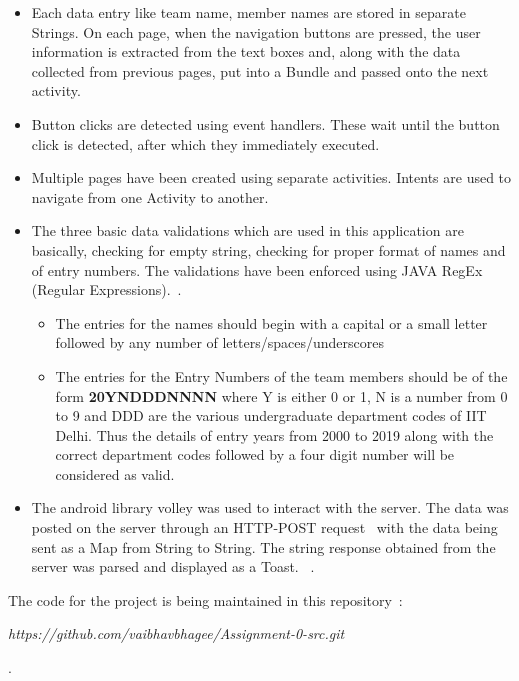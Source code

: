 \documentclass[12pt]{article}
\begin{document}
\begin{itemize}
\item Each data entry like team name, member names are stored in separate Strings. On each page, when the navigation buttons are pressed, the user information is extracted from the text boxes and, along with the data collected from previous pages, put into a Bundle and passed onto the next activity.
\item Button clicks are detected using event handlers. These wait until the button click is detected, after which they immediately executed.
\item Multiple pages have been created using separate activities. Intents are used to navigate from one Activity to another. 
\item The three basic data validations which are used in this application are basically, checking for empty string, checking for proper format of names and of entry numbers. The validations have been enforced using JAVA RegEx (Regular Expressions).~\cite{regex_test}.
	\begin{itemize}
		\item The entries for the names should begin with a capital or a small letter followed by any number of letters/spaces/underscores
		\item The entries for the Entry Numbers of the team members should be of the form \textbf{20YNDDDNNNN} where Y is either 0 or 1, N is a number from 0 to 9 and DDD are the various undergraduate department codes of IIT Delhi. Thus the details of entry years from 2000 to 2019 along with the correct department codes followed by a four digit number will be considered as valid.
	\end{itemize}
\item The android library volley was used to interact with the server. The data was posted on the server through an HTTP-POST request~\cite{post_volley} with the data being sent as a Map from String to String. The string response obtained from the server was parsed and displayed as a Toast.  
~\cite{android_network_tutorial}.
\end{itemize}

The code for the project is being maintained in this repository~\cite{git_tutorial}: \\\centerline{{\em https://github.com/vaibhavbhagee/Assignment-0-src.git}}.

\newpage


\medskip

\end{document}
